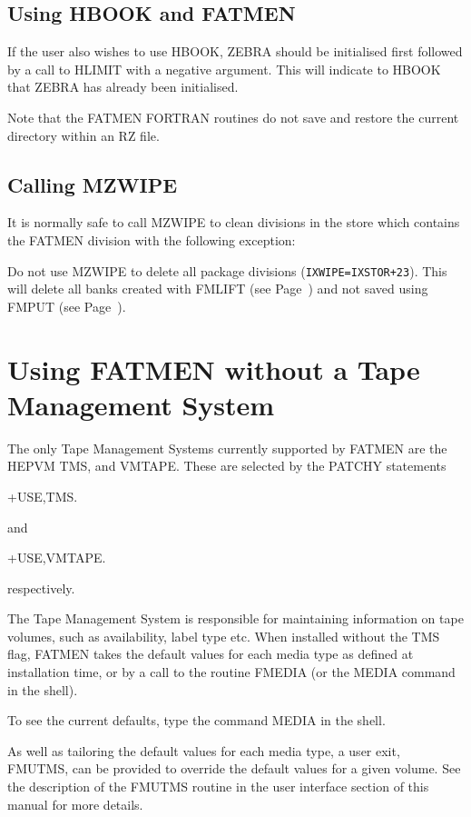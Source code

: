 \subsection{Using HBOOK and FATMEN}
\par
If the user also wishes to use HBOOK, ZEBRA should be initialised
first followed by a call to HLIMIT with a negative argument. This will
indicate to HBOOK that ZEBRA has already been initialised.
\par
Note that the FATMEN FORTRAN routines do not save and restore the
current directory within an RZ file. 
\subsection{Calling MZWIPE}
\par
It is normally safe to call MZWIPE to clean divisions in the store
which contains the FATMEN division with the following exception:
\begin{UL}
\item
Do not use MZWIPE to delete all package divisions
({\tt IXWIPE=IXSTOR+23}). This will delete all banks created with
FMLIFT (see Page~\pageref{FMLIFT}) and not saved using
FMPUT (see Page~\pageref{FMPUT}).
\end{UL}
\section{Using FATMEN without a Tape Management System}
\par
{}
The only Tape Management Systems currently supported by FATMEN
are the HEPVM TMS, and VMTAPE. These are selected by the PATCHY statements
\begin{XMP}
+USE,TMS.

and

+USE,VMTAPE.

respectively.
\end{XMP}
\par
{}
The Tape Management System is responsible for maintaining information
on tape volumes, such as availability, label type etc. When installed
without the TMS flag, FATMEN takes the default values for each
media type as defined at installation time, or by a call to the
routine FMEDIA (or the MEDIA command in the shell).
\par
To see the current defaults, type the command MEDIA in the shell.
\par
As well as tailoring the default values for each media type,
a user exit, FMUTMS, can be provided to override the default
values for a given volume. See the description of the FMUTMS 
routine in the user interface section of this manual for more details.
